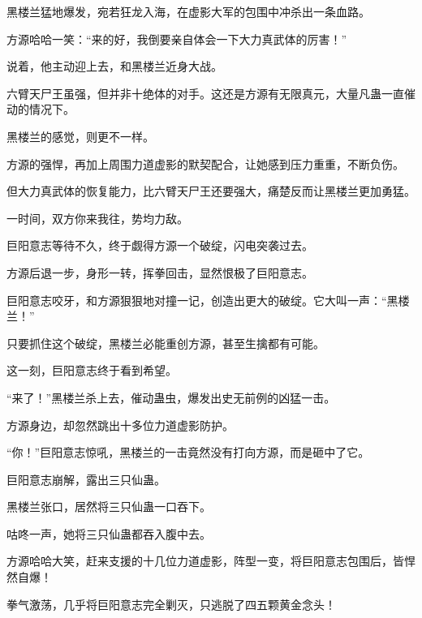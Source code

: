 \begin{this_body}
黑楼兰猛地爆发，宛若狂龙入海，在虚影大军的包围中冲杀出一条血路。

方源哈哈一笑：“来的好，我倒要亲自体会一下大力真武体的厉害！”

说着，他主动迎上去，和黑楼兰近身大战。

六臂天尸王虽强，但并非十绝体的对手。这还是方源有无限真元，大量凡蛊一直催动的情况下。

黑楼兰的感觉，则更不一样。

方源的强悍，再加上周围力道虚影的默契配合，让她感到压力重重，不断负伤。

但大力真武体的恢复能力，比六臂天尸王还要强大，痛楚反而让黑楼兰更加勇猛。

一时间，双方你来我往，势均力敌。

巨阳意志等待不久，终于觑得方源一个破绽，闪电突袭过去。

方源后退一步，身形一转，挥拳回击，显然恨极了巨阳意志。

巨阳意志咬牙，和方源狠狠地对撞一记，创造出更大的破绽。它大叫一声：“黑楼兰！”

只要抓住这个破绽，黑楼兰必能重创方源，甚至生擒都有可能。

这一刻，巨阳意志终于看到希望。

“来了！”黑楼兰杀上去，催动蛊虫，爆发出史无前例的凶猛一击。

方源身边，却忽然跳出十多位力道虚影防护。

“你！”巨阳意志惊吼，黑楼兰的一击竟然没有打向方源，而是砸中了它。

巨阳意志崩解，露出三只仙蛊。

黑楼兰张口，居然将三只仙蛊一口吞下。

咕咚一声，她将三只仙蛊都吞入腹中去。

方源哈哈大笑，赶来支援的十几位力道虚影，阵型一变，将巨阳意志包围后，皆悍然自爆！

拳气激荡，几乎将巨阳意志完全剿灭，只逃脱了四五颗黄金念头！

\end{this_body}


